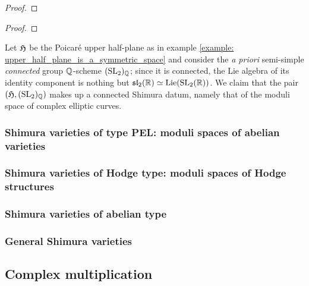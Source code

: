             \begin{lemma}
                
            \end{lemma}
                \begin{proof}
                    
                \end{proof}
            \begin{proposition}
                
            \end{proposition}
                \begin{proof}
                    
                \end{proof}
            \begin{example}
                Let $\mathfrak{H}$ be the Poicar\'e upper half-plane as in example \ref{example: upper_half_plane_is_a_symmetric_space} and consider the \textit{a priori} semi-simple \textit{connected} group $\mathbb{Q}$-scheme $(\operatorname{SL}_2)_{\mathbb{Q}}$; since it is connected, the Lie algebra of its identity component is nothing but $\mathfrak{sl}_2(\mathbb{R}) \simeq \mathrm{Lie}(\operatorname{SL}_2(\mathbb{R}))$. We claim that the pair $(\mathfrak{H}, (\operatorname{SL}_2)_{\mathbb{Q}})$ makes up a connected Shimura datum, namely that of the moduli space of complex elliptic curves.
            \end{example}
            \begin{example}
                
            \end{example}
            \begin{definition} \label{def: connected_shimura_varieties}
                
            \end{definition}
            
        \subsubsection{Shimura varieties of type PEL: moduli spaces of abelian varieties}
    
        \subsubsection{Shimura varieties of Hodge type: moduli spaces of Hodge structures}
        
        \subsubsection{Shimura varieties of abelian type}
        
        \subsubsection{General Shimura varieties}
        
    \subsection{Complex multiplication}